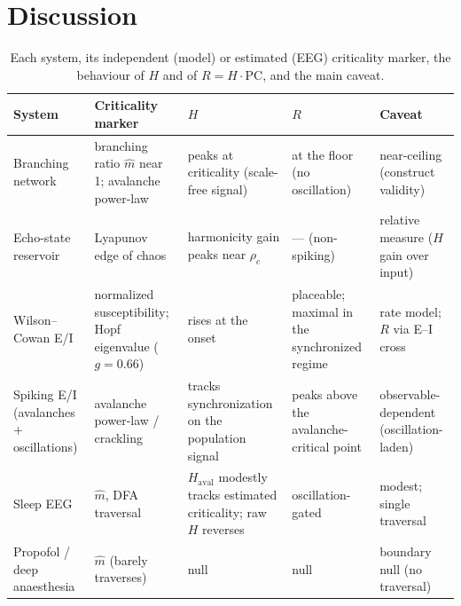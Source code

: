\documentclass[11pt]{article}
\begin{document}
\section{Discussion}
\begin{table}[t]\centering\footnotesize
\caption{Each system, its independent (model) or estimated (EEG) criticality marker, the behaviour of $H$ and of $R=H\cdot\mathrm{PC}$, and the main caveat.}\label{tab:summary}
\begin{tabular}{p{2.3cm}p{2.7cm}p{3.0cm}p{2.6cm}p{2.4cm}}\toprule
System & Criticality marker & $H$ & $R$ & Caveat \\ \midrule
Branching network & branching ratio $\hat m$ near 1; avalanche power-law & peaks at criticality (scale-free signal) & at the floor (no oscillation) & near-ceiling (construct validity) \\
Echo-state reservoir & Lyapunov edge of chaos & harmonicity gain peaks near $\rho_c$ & --- (non-spiking) & relative measure ($H$ gain over input) \\
Wilson--Cowan E/I & normalized susceptibility; Hopf eigenvalue ($g{=}0.66$) & rises at the onset & placeable; maximal in the synchronized regime & rate model; $R$ via E--I cross \\
Spiking E/I (avalanches + oscillations) & avalanche power-law / crackling & tracks synchronization on the population signal & peaks above the avalanche-critical point & observable-dependent (oscillation-laden) \\
Sleep EEG & $\hat m$, DFA traversal & $H_\mathrm{aval}$ modestly tracks estimated criticality; raw $H$ reverses & oscillation-gated & modest; single traversal \\
Propofol / deep anaesthesia & $\hat m$ (barely traverses) & null & null & boundary null (no traversal) \\ \bottomrule
\end{tabular}\end{table}
\end{document}
